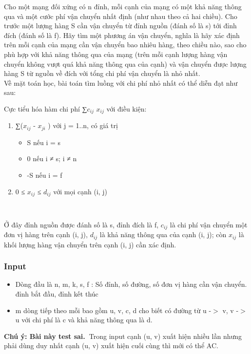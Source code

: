 

Cho một mạng đối xứng có n đỉnh, mỗi cạnh của mạng có một khả năng thông qua và một cước phí vận chuyển nhất định (như nhau theo cả hai chiều). Cho trước một lượng hàng S cần vận chuyển từ đỉnh nguồn (đánh số là s) tới đỉnh đích (đánh số là f). Hãy tìm một phương án vận chuyển, nghĩa là hãy xác định trên mỗi cạnh của mạng cần vận chuyển bao nhiêu hàng, theo chiều nào, sao cho phù hợp với khả năng thông qua của mạng (trên mỗi cạnh lượng hàng vận chuyển không vượt quá khả năng thông qua của cạnh) và vận chuyển được lượng hàng S từ nguồn về đích với tổng chi phí vận chuyển là nhỏ nhất.
\\Về mặt toán học, bài toán tìm luồng với chi phí nhỏ nhất có thể diễn đạt như sau:

Cực tiểu hóa hàm chi phí ∑$c_{ij}$ $x_{ij}$ với điều kiện:
\begin{enumerate}
	\item ∑($x_{ij}$ - $x_{ji}$ ) với j = 1..n, có giá trị
\begin{itemize}
	\item S nếu i = s
	\item 0 nếu i ≠ s; i ≠ n
	\item -S nếu i = f
\end{itemize}
	\item 0 ≤ $x_{ij}$ ≤ $d_{ij}$ với mọi cạnh (i, j)

 
\end{enumerate}

Ở đây đỉnh nguồn được đánh số là s, đỉnh đích là f, $c_{ij}$ là chi phí vận chuyển một đơn vị hàng trên cạnh (i, j), $d_{ij}$ là khả năng thông qua của cạnh (i, j); còn $x_{ij}$ là khối lượng hàng vận chuyển trên cạnh (i, j) cần xác định.

\subsubsection{Input}
\begin{itemize}
	\item Dòng đầu là n, m, k, s, f : Số đỉnh, số đường, số đơn vị hàng cần vận chuyển. đỉnh bắt đầu, đỉnh kết thúc
	\item m dòng tiếp theo mỗi bao gồm u, v, c, d cho biết có đường từ u -$>$ v, v -$>$ u với chi phí là c và khả năng thông qua là d.
\end{itemize}

\textbf{Chú ý: Bài này test sai. }Trong input cạnh (u, v) xuất hiện nhiều lần nhưng phải dùng duy nhất cạnh (u, v) xuất hiện cuối cùng thì mới có thể AC.

